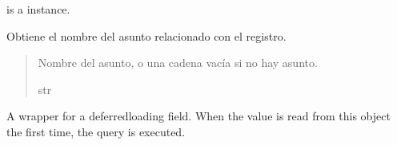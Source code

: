 \documentclass[letterpaper,10pt,spanish]{sphinxmanual}
\begin{document}
\begin{fulllineitems}
\begin{fulllineitems}
\sphinxAtStartPar
{} is a  instance.

\end{fulllineitems}



\begin{fulllineitems}

\pysigstartsignatures
{}
\pysigstopsignatures
\end{fulllineitems}



\begin{fulllineitems}

\pysigstartsignatures
{}
\pysigstopsignatures
\sphinxAtStartPar
Obtiene el nombre del asunto relacionado con el registro.
\begin{quote}\begin{description}
\sphinxAtStartPar
Nombre del asunto, o una cadena vacía si no hay asunto.

\sphinxAtStartPar
str

\end{description}\end{quote}

\end{fulllineitems}



\begin{fulllineitems}

\pysigstartsignatures
{}
\pysigstopsignatures
\sphinxAtStartPar
A wrapper for a deferred\sphinxhyphen{}loading field. When the value is read from this
object the first time, the query is executed.

\end{fulllineitems}



\begin{fulllineitems}

\pysigstartsignatures
{}
\pysigstopsignatures
\end{fulllineitems}




\end{fulllineitems}
\end{document}
